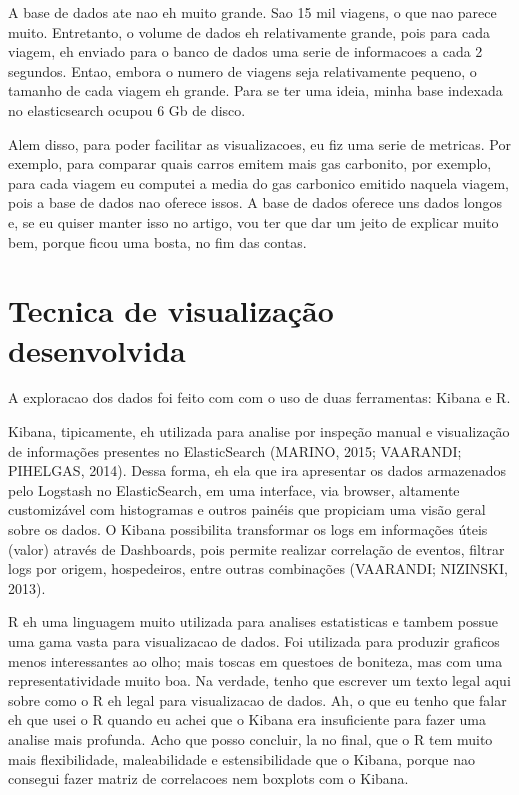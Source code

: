 \documentclass[10pt, conference]{IEEEtran}
\begin{document}
A base de dados ate nao eh muito grande. Sao 15 mil viagens, o que nao parece muito. Entretanto,
o volume de dados eh relativamente grande, pois para cada viagem, eh enviado para o banco de dados
uma serie de informacoes a cada 2 segundos. Entao, embora o numero de viagens seja relativamente 
pequeno, o tamanho de cada viagem eh grande. Para se ter uma ideia, minha base indexada no elasticsearch 
ocupou 6 Gb de disco.

Alem disso, para poder facilitar as visualizacoes, eu fiz uma serie de metricas. Por exemplo, 
para comparar quais carros emitem mais gas carbonito, por exemplo, para cada viagem eu computei
a media do gas carbonico emitido naquela viagem, pois a base de dados nao oferece issos. A base de
dados oferece uns dados longos e, se eu quiser manter isso no artigo, vou ter que dar
um jeito de explicar muito bem, porque ficou uma bosta, no fim das contas.



\section{Tecnica de visualização desenvolvida}
\label{sec:technique}
%
A exploracao dos dados foi feito com com o uso de duas ferramentas: Kibana e R.

Kibana, tipicamente, eh utilizada para analise por inspeção manual e visualização 
de informações presentes no
ElasticSearch (MARINO,  2015;  VAARANDI;  PIHELGAS,  2014).   Dessa  forma,  eh  ela  que
ira apresentar os dados armazenados pelo Logstash no ElasticSearch, em uma interface,  via
browser, altamente customizável com histogramas e outros painéis que propiciam uma visão
geral sobre os dados.  O Kibana possibilita transformar os logs em informações úteis (valor)
através  de Dashboards,  pois  permite  realizar  correlação  de  eventos,  filtrar logs
por  origem, hospedeiros, entre outras combinações (VAARANDI; NIZINSKI, 2013).

R eh uma linguagem muito utilizada para analises estatisticas e tambem possue uma gama
vasta para visualizacao de dados. Foi utilizada para produzir graficos menos interessantes
ao olho; mais toscas em questoes de boniteza, mas com uma representatividade muito boa.
Na verdade, tenho que escrever um texto legal aqui sobre como o R eh legal para visualizacao
de dados. Ah, o que eu tenho que falar eh que usei o R quando eu achei que o Kibana era 
insuficiente para fazer uma analise mais profunda. Acho que posso concluir, la no final,
que o R tem muito mais flexibilidade, maleabilidade e estensibilidade que o Kibana, porque
nao consegui fazer matriz de correlacoes nem boxplots com o Kibana.
\end{document}
